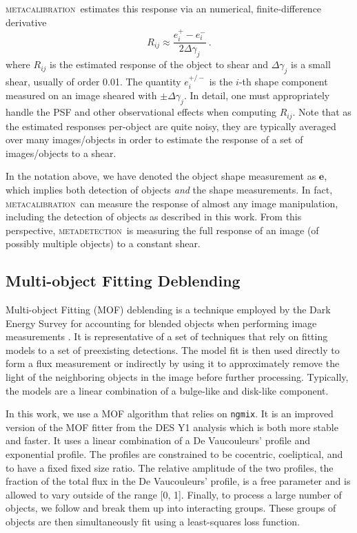 \documentclass[fleqn,useAMS,usenatbib]{mnras}
\newcommand{\ngmix}{\texttt{ngmix}}
\newcommand{\mcal}{\textsc{metacalibration}}
\newcommand{\mdet}{\textsc{metadetection}}
\begin{document}
\mcal\ estimates this response via an numerical, finite-difference derivative
\begin{displaymath}
R_{ij} \approx \frac{e_i^{+} - e_i^{-}}{2\Delta\gamma_j}\ .
\end{displaymath}
where $R_{ij}$ is the estimated response of the object to shear
and $\Delta\gamma_j$ is a small shear, usually of order 0.01. The quantity
$e_i^{+/-}$ is the $i$-th shape component measured on an image sheared with
$\pm\Delta\gamma_j$. In detail, one must appropriately handle the PSF and
other observational effects when computing $R_{ij}$. Note that as the
estimated responses per-object are quite noisy, they are typically averaged
over many images/objects in order to estimate the response of a set of
images/objects to a shear.

In the notation above, we have denoted the object shape measurement as $\boldsymbol{e}$,
which implies both detection of objects {\it and} the shape measurements. In fact,
\mcal\ can measure the response of almost any image manipulation, including the
detection of objects as described in this work. From this perspective, \mdet\
is measuring the full response of an image (of possibly multiple objects) to
a constant shear.

\subsection{Multi-object Fitting Deblending}

Multi-object Fitting (MOF) deblending is a technique employed by the Dark
Energy Survey for accounting for blended objects when performing image
measurements \citep{DESY1cat}. It is representative of a set of techniques that
rely on fitting models to a set of preexisting detections. The model fit is
then used directly to form a flux measurement or indirectly by using it to
approximately remove the light of the neighboring objects in the image
before further processing. Typically, the models are a linear combination
of a bulge-like and disk-like component.

In this work, we use a MOF algorithm
that relies on \ngmix. It is an improved version of the MOF fitter from the
DES Y1 analysis which is both more stable and faster. It uses a linear combination
of a De Vaucouleurs' \citep{devauc1948} profile and exponential profile. The
profiles are constrained to be cocentric, coeliptical, and to have a fixed
fixed size ratio. The relative amplitude of the two profiles, the fraction of the
total flux in the De Vaucouleurs' profile, is a free parameter and is allowed
to vary outside of the range [0, 1]. Finally, to process a large number of
objects, we follow \citet{DESY1cat} and break them up into interacting groups.
These groups of objects are then simultaneously fit using a least-squares loss
function.
\end{document}
